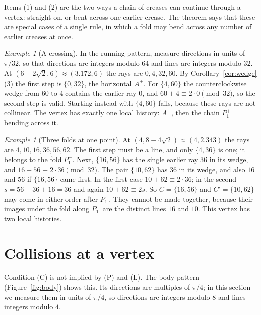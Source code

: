 \documentclass[11pt]{article}
\theoremstyle{definition}
\theoremstyle{remark}
\newtheorem{example}[theorem]{Example}
\begin{document}
Items (1) and (2) are the two ways a chain of creases can continue through a vertex: straight on, or bent across one earlier crease. The theorem says that these are special cases of a single rule, in which a fold may bend across any number of earlier creases at once.

\begin{example}[A crossing]\label{ex:crossing}
In the running pattern, measure directions in units of $\pi/32$, so that directions are integers modulo $64$ and lines are integers modulo $32$. At $(6-2\sqrt2,6)\approx(3.172,6)$ the rays are $0,4,32,60$. By Corollary~\ref{cor:wedge}(3) the first step is $\{0,32\}$, the horizontal $A^+$. For $\{4,60\}$ the counterclockwise wedge from $60$ to $4$ contains the earlier ray $0$, and $60+4\equiv2\cdot0\pmod{32}$, so the second step is valid. Starting instead with $\{4,60\}$ fails, because these rays are not collinear. The vertex has exactly one local history: $A^+$, then the chain $P_1^+$ bending across it.
\end{example}

\begin{example}[Three folds at one point]\label{ex:three}
At $(4,8-4\sqrt2)\approx(4,2.343)$ the rays are $4,10,16,36,56,62$. The first step must be a line, and only $\{4,36\}$ is one; it belongs to the fold $P_1^-$. Next, $\{16,56\}$ has the single earlier ray $36$ in its wedge, and $16+56\equiv2\cdot36\pmod{32}$. The pair $\{10,62\}$ has $36$ in its wedge, and also $16$ and $56$ if $\{16,56\}$ came first. In the first case $10+62\equiv 2\cdot 36$; in the second $s=56-36+16=36$ and again $10+62\equiv2s$. So $C=\{16,56\}$ and $C'=\{10,62\}$ may come in either order after $P_1^-$. They cannot be made together, because their images under the fold along $P_1^-$ are the distinct lines $16$ and $10$. This vertex has two local histories.
\end{example}

\section{Collisions at a vertex}\label{sec:collisions}

Condition (C) is not implied by (P) and (L). The body pattern (Figure~\ref{fig:body}) shows this. Its directions are multiples of $\pi/4$; in this section we measure them in units of $\pi/4$, so directions are integers modulo $8$ and lines integers modulo $4$.
\end{document}
